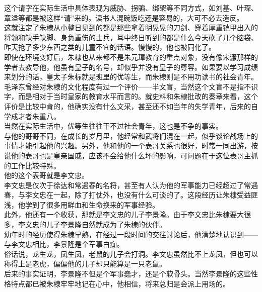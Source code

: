 \begin{multicols}{\theparacolNo}
这个请字在实际生活中具体表现为威胁、拐骗、绑架等不同方式，如刘基、叶琛、章溢等都是被这样“请”来的。读书人混碗饭吃还是容易的，大可不必去造反。\\

这就注定了朱棣从小整日见到的都是那些拿着明晃晃的刀剑、穿着厚重铠甲出入的将领和缺手缺脚、身负重伤的士兵，耳中终日听到的都是什么今天砍了几个脑袋、昨天抢了多少东西之类的儿童不宜的话语。慢慢的，他也被同化了。\\

即使在环境变好后，朱棣也从来都不是朱元璋教育的重点对象，没有像宋濂那样的学者去教导他，他虽有皇子的名号，却似乎并没有皇子的尊容。如果要以学习成绩来划分的话，皇太子朱标就是班里的优等生，而朱棣则是不用功读书的社会青年。\\

毛泽东曾经对朱棣的文化程度有过一个评价——半文盲，当然这个文盲不是指不识字，而是相对于当时皇家的教育水平而言的。就史料和朱棣批改的奏章来看，这个评价是比较中肯的，他确实没有什么文采，甚至还不如当年的失学青年，后来的自学成才者朱重八。\\

当然在实际生活中，优等生往往干不过社会青年，这也是不争的事实。\\

与他的哥哥不同，在成长的岁月里，他经常和武将们混在一起，似乎谈论战场上的事情才能引起他的兴趣。另外，他和他的一个表哥关系也很好，时常一同出游，按说他的表哥也是皇亲国戚，应该不会给他什么坏的影响，可问题在于这位表哥主抓的工作比较特殊。\\

他的这个表哥就是李文忠。\\

李文忠是仅次于徐达和常遇春的名将，甚至有人认为他的军事能力已经超过了常遇春，与李文忠在一起，除了打仗外，也没有什么可谈的了。这段经历让朱棣受益匪浅，他学到了很多用鲜血和生命换来的军事经验。\\

此外，他还有一个收获，那就是李文忠的儿子李景隆。由于李文忠比朱棣要大很多，李文忠的儿子李景隆自然就成为了朱棣的伙伴。\\

幼年时的经历使得朱棣早熟，在经过一段时间的交往讨论后，他清楚地认识到——与李文忠相比，李景隆是个军事白痴。\\

俗话说，龙生龙，凤生凤，老鼠的儿子会打洞。李文忠虽然比不上龙凤，但也可以称得上是老虎，偏偏他的儿子却只能算是一只老鼠。\\

后来的事实证明，李景隆不但是个军事蠢才，还是个软骨头。当然李景隆的这些性格特点都已被朱棣牢牢地记在心中，他相信，将来总归是会派上用场的。\\


\end{multicols}

